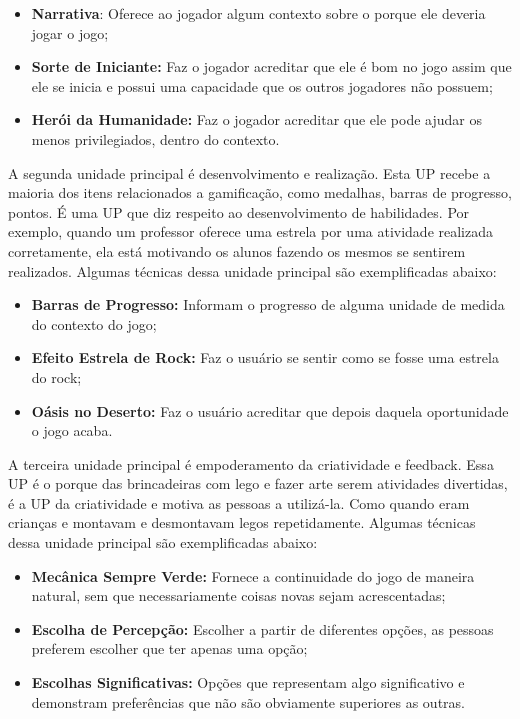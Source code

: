 \begin{itemize}
\item  \textbf{Narrativa}: Oferece ao jogador algum contexto sobre o porque ele deveria jogar o jogo;
\item  \textbf{Sorte de Iniciante:} Faz o jogador acreditar que ele é bom no jogo assim que ele se inicia e possui uma capacidade que os outros jogadores não possuem;
\item  \textbf{Herói da Humanidade:} Faz o jogador acreditar que ele pode ajudar os menos privilegiados, dentro do contexto.
\end{itemize}

A segunda unidade principal é desenvolvimento e realização. Esta UP recebe a maioria dos itens relacionados a gamificação, como medalhas, barras de progresso, pontos. É uma UP que diz respeito ao desenvolvimento de habilidades. Por exemplo, quando um professor oferece uma estrela por uma atividade realizada corretamente, ela está motivando os alunos fazendo os mesmos se sentirem realizados. Algumas técnicas dessa unidade principal são exemplificadas abaixo:

\begin{itemize}
\item  \textbf{Barras de Progresso:} Informam o progresso de alguma unidade de medida do contexto do jogo;
\item  \textbf{Efeito Estrela de Rock:} Faz o usuário se sentir como se fosse uma estrela do rock;
\item  \textbf{Oásis no Deserto:} Faz o usuário acreditar que depois daquela oportunidade o jogo acaba.
\end{itemize}

A terceira unidade principal é empoderamento da criatividade e feedback. Essa UP é o porque das brincadeiras com lego e fazer arte serem atividades divertidas, é a UP da criatividade e motiva as pessoas a utilizá-la. Como quando eram crianças e montavam e desmontavam legos repetidamente. Algumas técnicas dessa unidade principal são exemplificadas abaixo:

\begin{itemize}
\item  \textbf{Mecânica Sempre Verde:} Fornece a continuidade do jogo de maneira natural, sem que necessariamente coisas novas sejam acrescentadas;
\item  \textbf{Escolha de Percepção:} Escolher a partir de diferentes opções, as pessoas preferem escolher que ter apenas uma opção;
\item  \textbf{Escolhas Significativas:} Opções que representam algo significativo e demonstram preferências que não são obviamente superiores as outras.
\end{itemize}

